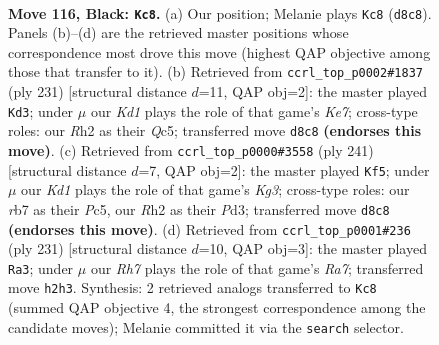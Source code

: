 \documentclass[11pt]{article}
\begin{document}
\clearpage

\begin{figure}[p]\centering
\begin{subfigure}{0.46\textwidth}\centering
\resizebox{\linewidth}{!}{%
\newchessgame
\chessboard[
  setfen={3k4/1R6/4p3/4P3/5PR1/8/7r/5K2 b - - 18 116},
  showmover=false,
  pgfstyle=straightmove, color=movearrow, markmove={d8-c8}
]}
\caption{}
\end{subfigure}\hfill
\begin{subfigure}{0.46\textwidth}\centering
\resizebox{\linewidth}{!}{%
\newchessgame
\chessboard[
  setfen={8/5R2/7p/2q5/8/7P/4k1P1/7K b - - 17 116},
  showmover=false,
  pgfstyle=straightmove, color=movearrow, markmove={e2-d3}
]}
\caption{}
\end{subfigure}
\\[4pt]
\begin{subfigure}{0.46\textwidth}\centering
\resizebox{\linewidth}{!}{%
\newchessgame
\chessboard[
  setfen={8/8/6k1/1Pp5/P3R3/3p4/8/1K6 b - - 0 121},
  showmover=false,
  pgfstyle=straightmove, color=movearrow, markmove={g6-f5}
]}
\caption{}
\end{subfigure}\hfill
\begin{subfigure}{0.46\textwidth}\centering
\resizebox{\linewidth}{!}{%
\newchessgame
\chessboard[
  setfen={8/8/2R5/4p1k1/4P3/5PK1/r7/8 b - - 0 116},
  showmover=false,
  pgfstyle=straightmove, color=movearrow, markmove={a2-a3}
]}
\caption{}
\end{subfigure}
\caption{\textbf{Move 116, Black: \texttt{Kc8}.} (a) Our position; Melanie plays \texttt{Kc8} (\texttt{d8c8}). Panels (b)--(d) are the retrieved master positions whose correspondence most drove this move (highest QAP objective among those that transfer to it). (b) Retrieved from \texttt{ccrl\_top\_p0002\#1837} (ply 231) [structural distance $d$=11, QAP obj=2]: the master played \texttt{Kd3}; under $\mu$ our \emph{Kd1} plays the role of that game's \emph{Ke7}; cross-type roles: our \emph{R}h2 as their \emph{Q}c5; transferred move \texttt{d8c8} \textbf{(endorses this move)}. (c) Retrieved from \texttt{ccrl\_top\_p0000\#3558} (ply 241) [structural distance $d$=7, QAP obj=2]: the master played \texttt{Kf5}; under $\mu$ our \emph{Kd1} plays the role of that game's \emph{Kg3}; cross-type roles: our \emph{r}b7 as their \emph{P}c5, our \emph{R}h2 as their \emph{P}d3; transferred move \texttt{d8c8} \textbf{(endorses this move)}. (d) Retrieved from \texttt{ccrl\_top\_p0001\#236} (ply 231) [structural distance $d$=10, QAP obj=3]: the master played \texttt{Ra3}; under $\mu$ our \emph{Rh7} plays the role of that game's \emph{Ra7}; transferred move \texttt{h2h3}. Synthesis: 2 retrieved analogs transferred to \texttt{Kc8} (summed QAP objective 4, the strongest correspondence among the candidate moves); Melanie committed it via the \texttt{search} selector.}
\label{fig:thought-m231}
\end{figure}
\end{document}
